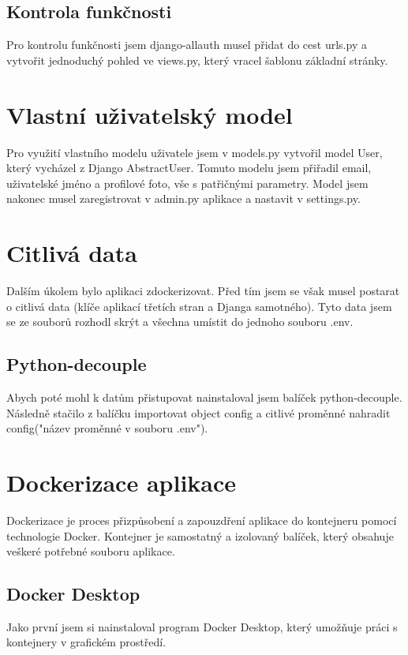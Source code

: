 \documentclass[12pt, a4paper,
twoside,        %
openright
]{report}
\begin{document}
\subsection{Kontrola funkčnosti}
Pro kontrolu funkčnosti jsem django-allauth musel přidat do cest urls.py a vytvořit jednoduchý pohled ve views.py, který vracel šablonu základní stránky.

\section{Vlastní uživatelský model}
\label{sec:vlastniuzivatelskymodel}
Pro využití vlastního modelu uživatele jsem v models.py vytvořil model User, který vycházel z Django AbstractUser. Tomuto modelu jsem přiřadil email, uživatelské jméno a profilové foto, vše s patřičnými parametry. Model jsem nakonec musel zaregistrovat v admin.py aplikace a nastavit v settings.py.

\section{Citlivá data}
\label{sec:citlivadata}
Dalším úkolem bylo aplikaci zdockerizovat. Před tím jsem se však musel postarat o citlivá data (klíče aplikací třetích stran a Djanga samotného). Tyto data jsem se ze souborů rozhodl skrýt a všechna umístit do jednoho souboru .env.

\subsection{Python-decouple}
Abych poté mohl k datům přistupovat nainstaloval jsem balíček python-decouple. Následně stačilo z balíčku importovat object config a citlivé proměnné nahradit config("název proměnné v souboru .env").

\section{Dockerizace aplikace}
\label{sec:dockerizaceaplikace}
Dockerizace je proces přizpůsobení a zapouzdření aplikace do kontejneru pomocí technologie Docker. Kontejner je samostatný a izolovaný balíček, který obsahuje veškeré potřebné souboru aplikace.
\subsection{Docker Desktop}
Jako první jsem si nainstaloval program Docker Desktop, který umožňuje práci s kontejnery v grafickém prostředí.
\end{document}
